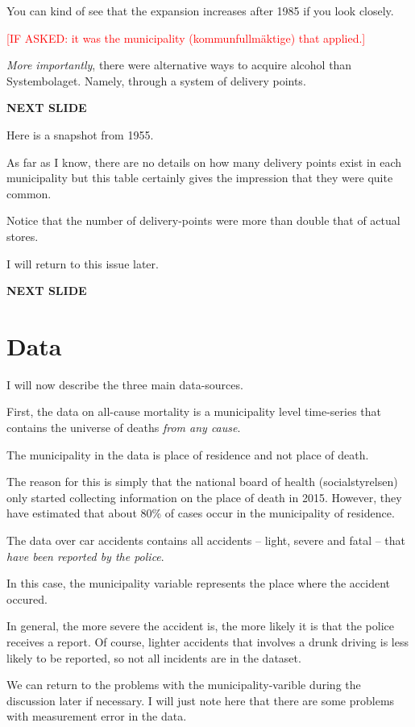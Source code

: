 \documentclass[12pt]{article}
\newcommand{\TODO}[1]{\textcolor{red}{[#1]}}
\begin{document}
 You can kind of see that the expansion increases after 1985 if you look closely.

 \TODO{IF ASKED: it was the municipality (kommunfullmäktige) that applied.}

\emph{More importantly}, there were alternative ways to acquire alcohol than Systembolaget. Namely, through a system of delivery points.

\textbf{NEXT SLIDE}

Here is a snapshot from 1955. 

As far as I know, there are no details on how many delivery points exist in each municipality but this table certainly gives the impression that they were quite common.

Notice that the number of delivery-points were more than double that of actual stores.

I will return to this issue later.

\textbf{NEXT SLIDE}

\section{Data}

I  will now describe the three main data-sources.

First, the data on all-cause mortality is a municipality level time-series that contains the universe of deaths \emph{from any cause}. 

The municipality in the data is place of residence and not place of death. 

The reason for this is simply that the national board of health (socialstyrelsen) only started collecting information on the place of death in 2015. However, they have estimated that about 80\% of cases occur in the municipality of residence.

The data over car accidents contains all accidents -- light, severe and fatal -- that \emph{have been reported by the police}. 

In this case, the municipality variable represents the place where the accident occured. 

In general, the more severe the accident is, the more likely it is that the police receives a report. Of course, lighter accidents that involves a drunk driving is less likely to be reported, so not all incidents are in the dataset.

We can return to the problems with the municipality-varible during the discussion later if necessary. I will just note here that there are some problems with measurement error in the data.
\end{document}

